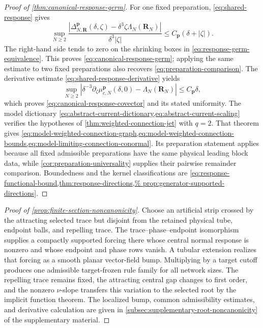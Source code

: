 \begin{proof}[Proof of \cref{thm:canonical-response-germ}]
For one fixed preparation, \cref{eq:shared-response} gives
\[
 \sup_{N\ge2}
 \frac{\left|\Delta^{\mathbf p}_{N,\mathbf R}(\delta,\zeta)
       -\delta^3\zeta\Lambda_N(\mathbf R_N)\right|}
      {\delta^3|\zeta|}
 \le C_{\mathbf p}(\delta+|\zeta|).
\]
The right-hand side tends to zero on the shrinking boxes in
\cref{eq:response-germ-equivalence}.  This proves
\cref{eq:canonical-response-germ}; applying the same estimate to two fixed
preparations also recovers \cref{eq:preparation-comparison}.  The derivative
estimate \cref{eq:shared-response-derivative} yields
\[
 \sup_{N\ge2}\left|
  \delta^{-3}\partial_\zeta
       \mu^{\mathbf p}_{c,N}(\delta,0)
       -\Lambda_N(\mathbf R_N)\right|
 \le C_{\mathbf p}\delta,
\]
which proves \cref{eq:canonical-response-covector} and its stated uniformity.
The model dictionary
\cref{eq:abstract-current-dictionary,eq:abstract-current-scaling} verifies
the hypotheses of \cref{thm:weighted-connection-jet} with \(q=2\).
That theorem gives
\cref{eq:model-weighted-connection-graph,eq:model-weighted-connection-bounds,eq:model-limiting-connection-conormal}.
Its preparation statement applies because all fixed admissible preparations
have the same physical leading block data, while
\cref{cor:preparation-universality} supplies their pairwise remainder
comparison.
Boundedness and the kernel classifications are
\cref{eq:response-functional-bound,thm:response-directions,%
prop:generator-supported-directions}.
\end{proof}

\begin{proof}[Proof of \cref{prop:finite-section-noncanonicity}]
Choose an artificial strip crossed by the attracting selected trace but
disjoint from the retained physical tube, endpoint balls, and repelling trace.
The trace--phase--endpoint isomorphism supplies a compactly supported forcing
there whose central normal response is nonzero and whose endpoint and phase
rows vanish.  A tubular extension realizes that forcing as a smooth planar
vector-field bump.  Multiplying by a target cutoff produces one admissible
target-frozen rule family for all network sizes.  The repelling trace remains
fixed, the attracting central gap changes to first order, and the nonzero
\(\nu\)-slope transfers this variation to the selected root by the implicit
function theorem.  The localized bump, common admissibility estimates, and
derivative calculation are given in
\cref{subsec:supplementary-root-noncanonicity} of the supplementary material.
\end{proof}

